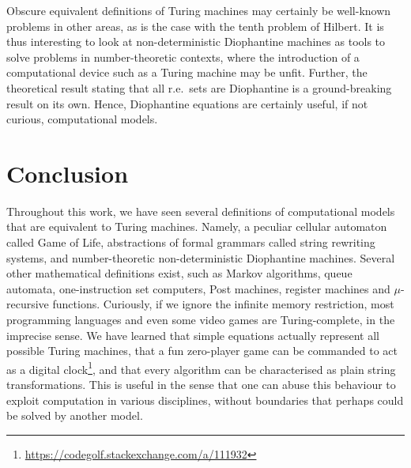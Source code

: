 \documentclass[12pt]{article}
\begin{document}
Obscure equivalent definitions of Turing machines may certainly be well-known
problems in other areas, as is the case with the tenth problem of Hilbert. It
is thus interesting to look at non-deterministic Diophantine machines as tools
to solve problems in number-theoretic contexts, where the introduction of a
computational device such as a Turing machine may be unfit. Further, the
theoretical result stating that all r.e.\ sets are Diophantine is a
ground-breaking result on its own. Hence, Diophantine equations are certainly
useful, if not curious, computational models.

\section{Conclusion}\label{sec:conc}

Throughout this work, we have seen several definitions of computational models
that are equivalent to Turing machines. Namely, a peculiar cellular automaton
called Game of Life, abstractions of formal grammars called string rewriting
systems, and number-theoretic non-deterministic Diophantine machines. Several
other mathematical definitions exist, such as Markov algorithms, queue
automata, one-instruction set computers, Post machines, register machines and
$\mu$-recursive functions. Curiously, if we ignore the infinite memory
restriction, most programming languages and even some video games are
Turing-complete, in the imprecise sense. We have learned that simple equations
actually represent all possible Turing machines, that a fun zero-player game
can be commanded to act as a digital
clock\footnote{\url{https://codegolf.stackexchange.com/a/111932}}, and that
every algorithm can be characterised as plain string transformations. This is
useful in the sense that one can abuse this behaviour to exploit computation in
various disciplines, without boundaries that perhaps could be solved by another
model.



\end{document}
